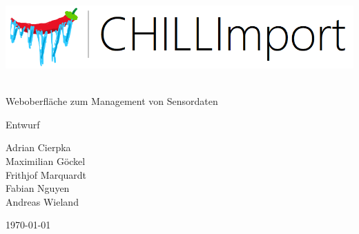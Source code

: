 \documentclass[a4paper, 12pt, titlepage]{article}
\begin{document}
\begin{titlepage}
	\centering
	\includegraphics[scale=0.7]{logo}
	{\ \vspace{1.5cm}\\ \LARGE Weboberfläche zum Management von Sensordaten \par}
	\vspace{2cm}
	{\Large Entwurf\par}
	\vspace{2.5cm}
	\par
	{\large Adrian Cierpka \\
Maximilian Göckel \\
Frithjof Marquardt \\
Fabian Nguyen \\
Andreas Wieland
\vspace{4cm}}

	{\large \today\par}
\end{titlepage}

\tableofcontents
\clearpage
{} 


%

%






%

%
\end{document}
